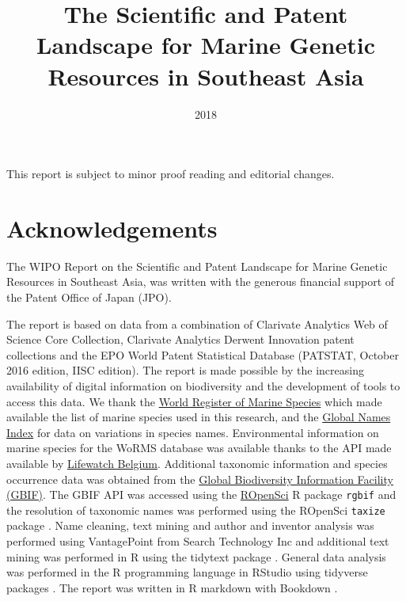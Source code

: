 \documentclass[openany]{book}
\title{The Scientific and Patent Landscape for Marine Genetic Resources in
Southeast Asia}
\author{}
\date{2018}
\theoremstyle{definition}
\theoremstyle{definition}
\theoremstyle{definition}
\theoremstyle{remark}
\begin{document}
\maketitle

{
\setcounter{tocdepth}{2}
\tableofcontents
}
\hypertarget{section}{%
\chapter*{}\label{section}}

This report is subject to minor proof reading and editorial changes.

\hypertarget{acknowledgements}{%
\chapter*{Acknowledgements}\label{acknowledgements}}

The WIPO Report on the Scientific and Patent Landscape for Marine
Genetic Resources in Southeast Asia, was written with the generous
financial support of the Patent Office of Japan (JPO).

The report is based on data from a combination of Clarivate Analytics
Web of Science Core Collection, Clarivate Analytics Derwent Innovation
patent collections and the EPO World Patent Statistical Database
(PATSTAT, October 2016 edition, IISC edition). The report is made
possible by the increasing availability of digital information on
biodiversity and the development of tools to access this data. We thank
the \href{http://www.marinespecies.org/}{World Register of Marine
Species} which made available the list of marine species used in this
research, and the \href{http://gni.globalnames.org/}{Global Names Index}
for data on variations in species names. Environmental information on
marine species for the WoRMS database was available thanks to the API
made available by
\href{http://www.lifewatch.be/data-services/?cache=1521050271}{Lifewatch
Belgium}. Additional taxonomic information and species occurrence data
was obtained from the \href{https://www.gbif.org/}{Global Biodiversity
Information Facility (GBIF)}. The GBIF API was accessed using the
\href{https://ropensci.org/}{ROpenSci} R package \texttt{rgbif} and the
resolution of taxonomic names was performed using the ROpenSci
\texttt{taxize} package \citep{R-rgbif, R-taxize}. Name cleaning, text
mining and author and inventor analysis was performed using VantagePoint
from Search Technology Inc and additional text mining was performed in R
using the tidytext package \citep{R-tidytext}. General data analysis was
performed in the R programming language in RStudio using tidyverse
packages \citep{R-base, R-tidyverse}. The report was written in R
markdown with Bookdown \citep{R-rmarkdown, R-bookdown}.
\end{document}
